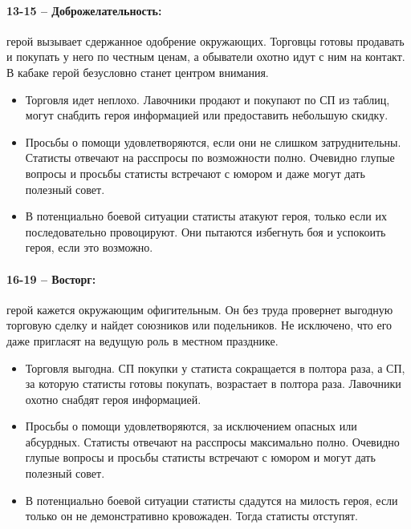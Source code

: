 \paragraph{13-15 – Доброжелательность:} герой вызывает сдержанное одобрение окружающих. Торговцы готовы продавать и покупать у него по честным ценам, а обыватели охотно идут с ним на контакт. В кабаке герой безусловно станет центром внимания.
\begin{itemize}
  \item Торговля идет неплохо. Лавочники продают и покупают по СП из таблиц, могут снабдить героя информацией или предоставить небольшую скидку.
  \item Просьбы о помощи удовлетворяются, если они не слишком затруднительны. Статисты отвечают на расспросы по возможности полно. Очевидно глупые вопросы и просьбы статисты встречают с юмором и даже могут дать полезный совет.
  \item В потенциально боевой ситуации статисты атакуют героя, только если их последовательно провоцируют. Они пытаются избегнуть боя и успокоить героя, если это возможно.
\end{itemize}
\paragraph{16-19 – Восторг:} герой кажется окружающим офигительным. Он без труда провернет выгодную торговую сделку и найдет союзников или подельников. Не исключено, что его даже пригласят на ведущую роль в местном празднике.
\begin{itemize}
  \item Торговля выгодна. СП покупки у статиста сокращается в полтора раза, а СП, за которую статисты готовы покупать, возрастает в полтора раза. Лавочники охотно снабдят героя информацией.
  \item Просьбы о помощи удовлетворяются, за исключением опасных или абсурдных. Статисты отвечают на расспросы максимально полно. Очевидно глупые вопросы и просьбы статисты встречают с юмором и могут дать полезный совет.
  \item В потенциально боевой ситуации статисты сдадутся на милость героя, если только он не демонстративно кровожаден. Тогда статисты отступят.
\end{itemize}
